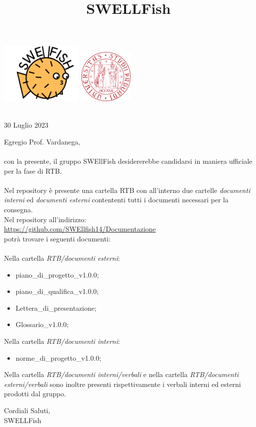 \documentclass[12pt]{article}
\begin{document}
\graphicspath{ {../templates/img/} }
\title{SWELLFish}

\begin{center}
    \includegraphics[width=0.3\textwidth]{../templates/img/Swellfish_logo.png}
    \hspace{3cm}
    \includegraphics[width=0.2\textwidth]{../templates/img/logoUnipd.png}\\
    \end{center}
    \begin{flushright}
        \
        \textbf{}\\
        30 Luglio 2023
    \end{flushright}  

Egregio Prof. Vardanega,\\\\
con la presente, il gruppo SWEllFish desidererebbe candidarsi in maniera ufficiale
per la fase di RTB.\\\\
Nel repository è presente una cartella RTB con all’interno due cartelle \textit{documenti interni} ed \textit{documenti esterni} contententi tutti i documenti necessari
per la consegna.\\
Nel repository all'indirizzo: \\
\href{https://github.com/SWEllfish14/Documentazione}{\underline{https://github.com/SWEllfish14/Documentazione}}\\ 
potrà trovare i seguenti documenti:\\\\

Nella cartella \textit{RTB/documenti esterni}:
\begin{itemize}
\item piano\_di\_progetto\_v1.0.0;
\item piano\_di\_qualifica\_v1.0.0;
\item Lettera\_di\_presentazione;
\item Glossario\_v1.0.0;
\end{itemize}
Nella cartella \textit{RTB/documenti interni}:
\begin{itemize}
    \item norme\_di\_progetto\_v1.0.0;
\end{itemize}
 Nella cartella \textit{RTB/documenti interni/verbali} e nella cartella \textit{ RTB/documenti
esterni/verbali} sono inoltre presenti rispettivamente i verbali interni ed esterni prodotti dal gruppo. 

\begin{flushright}
Cordiali Saluti,\\
SWELLFish
\end{flushright}
\end{document}
